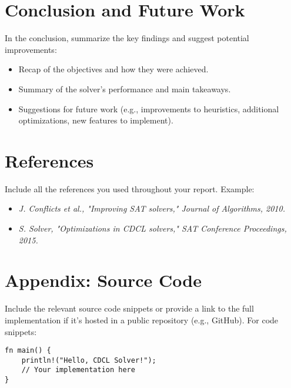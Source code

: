 \documentclass[a4paper,12pt]{article}
\begin{document}
\section{Conclusion and Future Work}
\label{sec:conclusion}
In the conclusion, summarize the key findings and suggest potential improvements:
\begin{itemize}
    \item Recap of the objectives and how they were achieved.
    \item Summary of the solver’s performance and main takeaways.
    \item Suggestions for future work (e.g., improvements to heuristics, additional optimizations, new features to implement).
\end{itemize}

\section{References}
\label{sec:references}
Include all the references you used throughout your report. Example:
\begin{itemize}
    \item \textit{J. Conflicts et al., "Improving SAT solvers," Journal of Algorithms, 2010.}
    \item \textit{S. Solver, "Optimizations in CDCL solvers," SAT Conference Proceedings, 2015.}
\end{itemize}

\newpage
\appendix
\section{Appendix: Source Code}
\label{sec:appendix}
Include the relevant source code snippets or provide a link to the full implementation if it's hosted in a public repository (e.g., GitHub). For code snippets:
\begin{verbatim}
fn main() {
    println!("Hello, CDCL Solver!");
    // Your implementation here
}
\end{verbatim}
\end{document}
